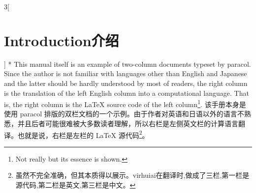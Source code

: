 \begin{paracol}{3}[\section{Introduction\hfill 介绍}]
\switchcolumn[1]*
This manual itself is an example of two-column documents typeset by
\textsf{paracol}.  Since the author is not familiar with languages other
than English and Japanese and the latter should be hardly understood by
most of readers, the right column is the translation of the left English
column into a computational language.  That is, the right column is the
\LaTeX{} source code of the left column\footnote{%
Not really but its essence
is shown.\label{fn:first}}.
\switchcolumn
该手册本身是使用 \textsf{paracol} 排版的双栏文档的一个示例。由于作者对英语和日语以外的语言不熟悉，并且后者可能很难被大多数读者理解，所以右栏是左侧英文栏的计算语言翻译。也就是说，右栏是左栏的 \LaTeX{} 源代码\footnote{%
虽然不完全准确，但其本质得以展示。\label{fn:first}virhuiai在翻译时,做成了三栏,第一栏是源代码,第二栏是英文,第三栏是中文。}。
\end{paracol}
